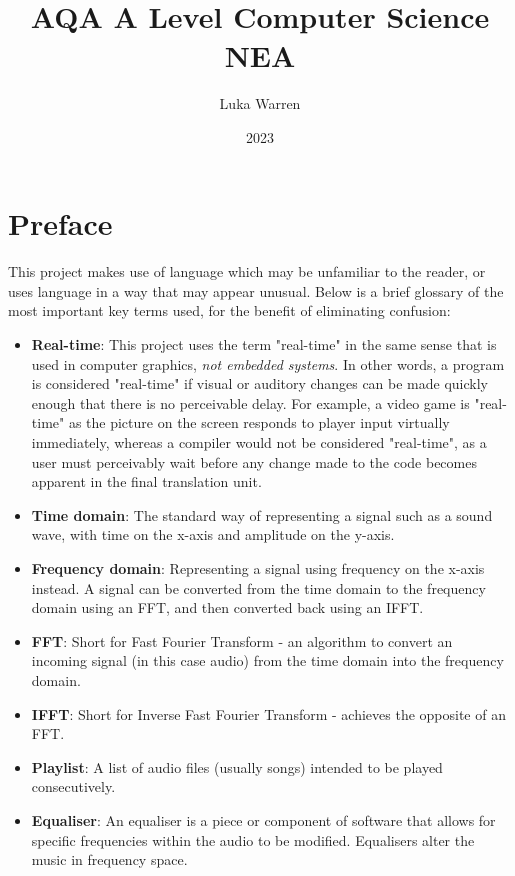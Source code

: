 \documentclass{article}
\title{AQA A Level Computer Science NEA}
\date{2023}
\author{Luka Warren}
\begin{document}
	\maketitle
	\tableofcontents
	\newpage

	
	\setcounter{section}{-1}
	\section {Preface}
	\paragraph{}
	This project makes use of language which may be unfamiliar to the reader, or uses language in a way that may appear unusual. Below is a brief glossary of the most important key terms used, for the benefit of eliminating confusion:
	
	\begin{itemize}
		\item \textbf{Real-time}: This project uses the term "real-time" in the same sense that is used in computer graphics, \textit{not embedded systems}. In other words, a program is considered "real-time" if visual or auditory changes can be made quickly enough that there is no perceivable delay. For example, a video game is "real-time" as the picture on the screen responds to player input virtually immediately, whereas a compiler would not be considered "real-time", as a user must perceivably wait before any change made to the code becomes apparent in the final translation unit.
		
		\item \textbf{Time domain}: The standard way of representing a signal such as a sound wave, with time on the x-axis and amplitude on the y-axis.
		
		\item \textbf{Frequency domain}: Representing a signal using frequency on the x-axis instead. A signal can be converted from the time domain to the frequency domain using an FFT, and then converted back using an IFFT.
		
		\item \textbf{FFT}: Short for Fast Fourier Transform - an algorithm to convert an incoming signal (in this case audio) from the time domain into the frequency domain.
		
		\item \textbf{IFFT}: Short for Inverse Fast Fourier Transform - achieves the opposite of an FFT.
		
		\item \textbf{Playlist}: A list of audio files (usually songs)  intended to be played consecutively.
		
		\item \textbf{Equaliser}: An equaliser is a piece or component of software that allows for specific frequencies within the audio to be modified. Equalisers alter the music in frequency space.
	\end{itemize}
\end{document}
